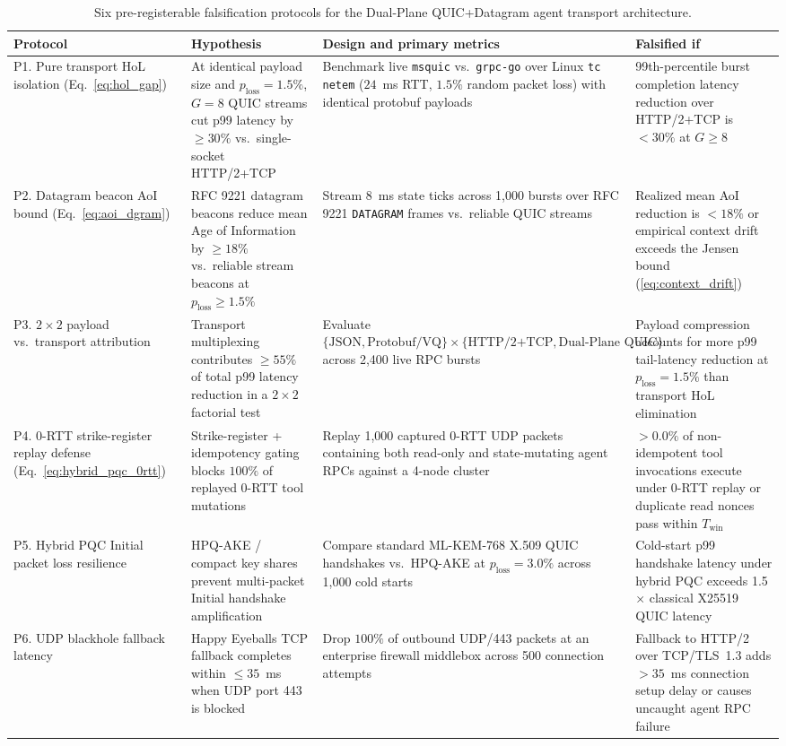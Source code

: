 \documentclass[11pt]{article}
\begin{document}
\begin{table}[ht]
\centering
\small
\caption{Six pre-registerable falsification protocols for the Dual-Plane QUIC+Datagram agent transport architecture.}
\label{tab:protocol}
\begin{tabularx}{\textwidth}{@{}P{2.3cm}YYY@{}}
\toprule
Protocol & Hypothesis & Design and primary metrics & Falsified if \\
\midrule
P1. Pure transport HoL isolation (Eq.~\ref{eq:hol_gap}) & At identical payload size and $p_{\mathrm{loss}} = 1.5\%$, $G=8$ QUIC streams cut p99 latency by $\ge 30\%$ vs.\ single-socket HTTP/2+TCP & Benchmark live \texttt{msquic} vs.\ \texttt{grpc-go} over Linux \texttt{tc netem} ($24$~ms RTT, $1.5\%$ random packet loss) with identical protobuf payloads & 99th-percentile burst completion latency reduction over HTTP/2+TCP is $<30\%$ at $G \ge 8$\\
P2. Datagram beacon AoI bound (Eq.~\ref{eq:aoi_dgram}) & RFC 9221 datagram beacons reduce mean Age of Information by $\ge 18\%$ vs.\ reliable stream beacons at $p_{\mathrm{loss}} \ge 1.5\%$ & Stream $8$~ms state ticks across 1{,}000 bursts over RFC 9221 \texttt{DATAGRAM} frames vs.\ reliable QUIC streams & Realized mean AoI reduction is $<18\%$ or empirical context drift exceeds the Jensen bound (\ref{eq:context_drift})\\
P3. $2\times 2$ payload vs.\ transport attribution & Transport multiplexing contributes $\ge 55\%$ of total p99 latency reduction in a $2\times 2$ factorial test & Evaluate $\{\text{JSON},\allowbreak \text{Protobuf/VQ}\} \times \{\text{HTTP/2+TCP},\allowbreak \text{Dual-Plane QUIC}\}$ across 2{,}400 live RPC bursts & Payload compression accounts for more p99 tail-latency reduction at $p_{\mathrm{loss}} = 1.5\%$ than transport HoL elimination\\
P4. 0-RTT strike-register replay defense (Eq.~\ref{eq:hybrid_pqc_0rtt}) & Strike-register + idempotency gating blocks $100\%$ of replayed 0-RTT tool mutations & Replay 1{,}000 captured 0-RTT UDP packets containing both read-only and state-mutating agent RPCs against a 4-node cluster & $>0.0\%$ of non-idempotent tool invocations execute under 0-RTT replay or duplicate read nonces pass within $T_{\mathrm{win}}$\\
P5. Hybrid PQC Initial packet loss resilience & HPQ-AKE / compact key shares \citep{phamtuan2026hpqake} prevent multi-packet Initial handshake amplification & Compare standard ML-KEM-768 X.509 QUIC handshakes vs.\ HPQ-AKE at $p_{\mathrm{loss}} = 3.0\%$ across 1{,}000 cold starts & Cold-start p99 handshake latency under hybrid PQC exceeds 1.5$\times$ classical X25519 QUIC latency\\
P6. UDP blackhole fallback latency & Happy Eyeballs TCP fallback completes within $\le 35$~ms when UDP port 443 is blocked & Drop $100\%$ of outbound UDP/443 packets at an enterprise firewall middlebox across 500 connection attempts & Fallback to HTTP/2 over TCP/TLS~1.3 adds $>35$~ms connection setup delay or causes uncaught agent RPC failure\\
\bottomrule\end{tabularx}
\end{table}
\end{document}
